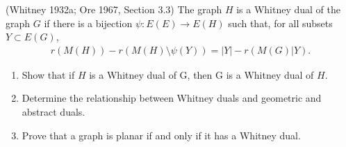 \prob
{
    (Whitney 1932a; Ore 1967, Section 3.3) The graph $H$ is a Whitney dual of the graph $G$ if there is a bijection 
    $\psi : E(E) \rightarrow E(H)$ such that, for all subsets $Y \subset E(G)$,
    \begin{align}
            r(M(H)) - r(M(H)\setminus \psi(Y)) = |Y| - r(M(G)|Y).
    \end{align}
    \begin{enumerate}[label=(\roman*)]
        \item Show that if $H$ is a Whitney dual of G, then G is a Whitney dual of $H$.
        \item Determine the relationship between Whitney duals and geometric and abstract duals.
        \item Prove that a graph is planar if and only if it has a Whitney dual.
    \end{enumerate}
}
